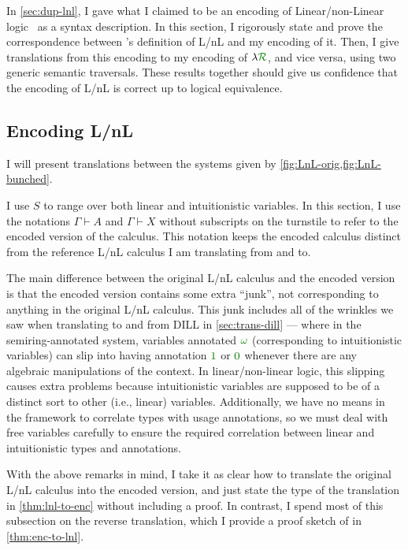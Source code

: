 In \cref{sec:dup-lnl}, I gave what I claimed to be an encoding of
Linear/non-Linear logic~\citep{Benton94} as a syntax description.
In this section, I rigorously state and prove the correspondence between
\citeauthor{Benton94}'s definition of L/nL and my encoding of it.
Then, I give translations from this encoding to my encoding of $\name$, and
vice versa, using two generic semantic traversals.
These results together should give us confidence that the encoding of L/nL is
correct up to logical equivalence.

\subsection{Encoding L/nL}\label{sec:encoding-LnL}

I will present translations between the systems given by
\cref{fig:LnL-orig,fig:LnL-bunched}.

I use $S$ to range over both linear and intuitionistic variables.
In this section, I use the notations $\Gamma \vdash A$ and $\Gamma \vdash X$
without subscripts on the turnstile to refer to the encoded version of the
calculus.
This notation keeps the encoded calculus distinct from the reference L/nL
calculus I am translating from and to.

The main difference between the original L/nL calculus and the encoded version
is that the encoded version contains some extra ``junk'', not corresponding to
anything in the original L/nL calculus.
This junk includes all of the wrinkles we saw when translating to and from DILL
in \cref{sec:trans-dill} --- where in the semiring-annotated system, variables
annotated $\gr\omega$ (corresponding to intuitionistic variables) can slip into
having annotation $\gr1$ or $\gr0$ whenever there are any algebraic
manipulations of the context.
In linear/non-linear logic, this slipping causes extra problems because
intuitionistic variables are supposed to be of a distinct sort to other
(i.e., linear) variables.
Additionally, we have no means in the framework to correlate types with usage
annotations, so we must deal with free variables carefully to ensure the
required correlation between linear and intuitionistic types and annotations.

With the above remarks in mind, I take it as clear how to translate the original
L/nL calculus into the encoded version, and just state the type of the
translation in \cref{thm:lnl-to-enc} without including a proof.
In contrast, I spend most of this subsection on the reverse translation, which
I provide a proof sketch of in \cref{thm:enc-to-lnl}.


